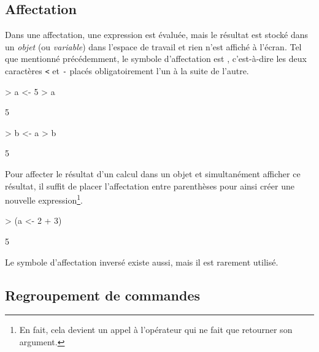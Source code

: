 \subsection{Affectation}
\label{sec:premiers:commandes:affectation}

Dans une affectation, une expression est évaluée, mais le résultat est
stocké dans un \emph{objet} (ou \emph{variable}) dans l'espace de
travail et rien n'est affiché à l'écran. Tel que mentionné
précédemment, le symbole d'affectation est \icode{<-}, c'est-à-dire
les deux caractères \verb|<| et \verb|-| placés obligatoirement l'un à
la suite de l'autre.
\begin{Schunk}
\begin{Sinput}
> a <- 5
> a
\end{Sinput}
\begin{Soutput}
[1] 5
\end{Soutput}
\begin{Sinput}
> b <- a
> b
\end{Sinput}
\begin{Soutput}
[1] 5
\end{Soutput}
\end{Schunk}

Pour affecter le résultat d'un calcul dans un objet et simultanément
afficher ce résultat, il suffit de placer l'affectation entre
parenthèses pour ainsi créer une nouvelle expression\footnote{%
  En fait, cela devient un appel à l'opérateur  qui ne fait
  que retourner son argument.}.
\begin{Schunk}
\begin{Sinput}
> (a <- 2 + 3)
\end{Sinput}
\begin{Soutput}
[1] 5
\end{Soutput}
\end{Schunk}

Le symbole d'affectation inversé \icode{->} existe aussi, mais il
est rarement utilisé.


\subsection{Regroupement de commandes}
\label{sec:premiers:commandes:regroupement}

